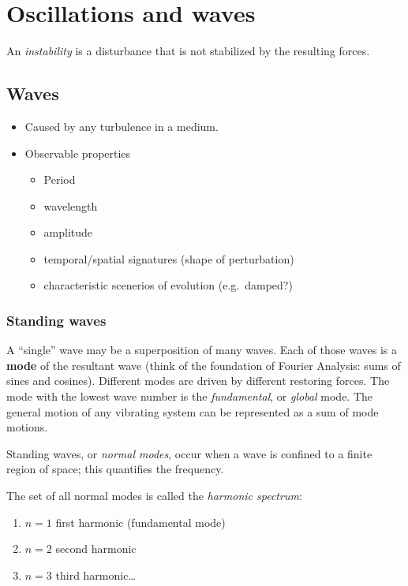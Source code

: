 \documentclass{article}
\begin{document}
\section{Oscillations and waves}

An \textit{instability} is a disturbance that is not stabilized by the
resulting forces.

\subsection{Waves}
\begin{itemize}
    \item Caused by any turbulence in a medium.
    \item Observable properties
        \begin{itemize}
            \item Period
            \item wavelength
            \item amplitude
            \item temporal/spatial signatures (shape of perturbation)
            \item characteristic scenerios of evolution (e.g.\ damped?)
        \end{itemize}
\end{itemize}

\subsubsection{Standing waves}
A ``single'' wave may be a superposition of many waves. Each of those waves is
a \textbf{mode} of the resultant wave (think of the foundation of Fourier
Analysis: sums of sines and cosines). Different modes are driven by different
restoring forces. The mode with the lowest wave number is the
\textit{fundamental}, or \textit{global} mode. The general motion of any
vibrating system can be represented as a sum of mode motions.

Standing waves, or \textit{normal modes},
occur when a wave is confined to a finite
region of space; this quantifies the frequency.

The set of all normal modes
is called the \textit{harmonic spectrum}:
\begin{enumerate}
    \item $n=1$ first harmonic (fundamental mode)
    \item $n=2$ second harmonic
    \item $n=3$ third harmonic\ldots
\end{enumerate}
\end{document}
